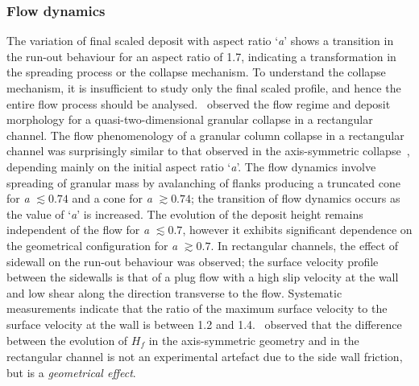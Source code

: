 \subsubsection{Flow dynamics}
The variation of final scaled deposit with aspect ratio `\textit{a}' shows a 
transition in the run-out behaviour for an aspect ratio of 1.7, indicating a 
transformation in the spreading process or the collapse mechanism. To 
understand the collapse mechanism, it is insufficient to study only the final 
scaled profile, and hence the entire flow process should be 
analysed.~\citet{Lajeunesse2005} observed the flow regime and deposit 
morphology for a quasi-two-dimensional granular collapse in a rectangular 
channel. The flow phenomenology of a granular column collapse in a rectangular 
channel was surprisingly similar to that observed in the axis-symmetric 
collapse~\citep{Lube2005,Lajeunesse2004}, depending mainly on the initial 
aspect ratio `\textit{a}'. The flow dynamics involve spreading of granular mass 
by avalanching of flanks producing a truncated cone for \textit{a} $\lesssim 
0.74$ and a cone for \textit{a} $\gtrsim 0.74$; the transition of flow dynamics 
occurs as the value of `\textit{a}' is increased. The evolution of the deposit 
height remains independent of the flow for \textit{a} $\lesssim 0.7$, however 
it exhibits significant dependence on the geometrical configuration for 
\textit{a} $\gtrsim 0.7$. In rectangular channels, the effect of sidewall on 
the run-out behaviour was observed; the surface velocity profile between the 
sidewalls is that of a plug flow with a high slip velocity at the wall and low 
shear along the direction transverse to the flow. Systematic measurements 
indicate that the ratio of the maximum surface velocity to the surface velocity 
at the wall is between 1.2 and 1.4.~\citet{Lajeunesse2005} observed that the 
difference between the evolution of $\textit{H}_{\textit{f}}$ in the 
axis-symmetric geometry and in the rectangular channel is not an experimental 
artefact due to the side wall friction, but is a \textit{geometrical effect}. 


